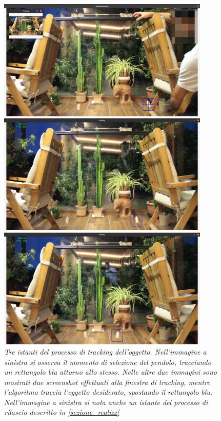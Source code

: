 \documentclass[11pt, a4paper, twoside, italian]{article}
\begin{document}
\begin{figure}[h!]
  \centering
\begin{minipage}{0.3\textwidth}
  \centering
  \includegraphics[width=0.9\textwidth]{../../media/img/tracking_1.png}
\end{minipage}
\begin{minipage}{0.3\textwidth}
  \centering
  \includegraphics[width=0.9\textwidth]{../../media/img/tracking_2.png}
\end{minipage}
\begin{minipage}{0.3\textwidth}
  \centering
  \includegraphics[width=0.9\textwidth]{../../media/img/tracking_3.png}
\end{minipage}
\caption{\textit{Tre istanti del processo di tracking dell'oggetto.
Nell'immagine a sinistra si osserva il momento di selezione del pendolo, tracciando un rettangolo blu attorno 
allo stesso. Nelle altre due immagini sono mostrati due screenshot effettuati alla 
finestra di tracking, mentre l'algoritmo traccia l'oggetto desiderato, spostando il rettangolo blu.
Nell'immagine a sinistra si nota anche un istante del processo di rilascio descritto in \cref{sezione_realizz}}}
\label{photo_tracking}
\end{figure}
\end{document}
